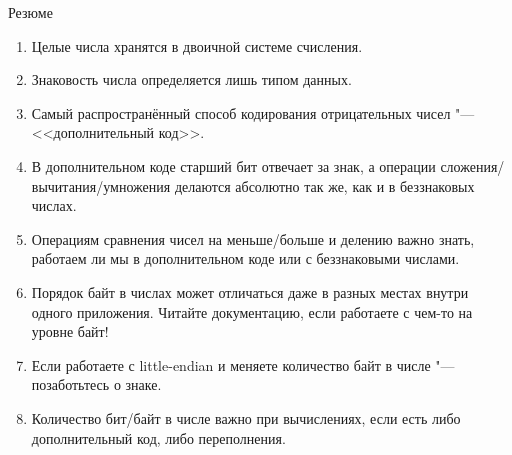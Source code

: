\begin{frame}{Резюме}
	\begin{enumerate}
		\item
			Целые числа хранятся в двоичной системе счисления.
		\item
			Знаковость числа определяется лишь типом данных.
		\item
			Самый распространённый способ кодирования отрицательных чисел "--- <<дополнительный код>>.
		\item
			В дополнительном коде старший бит отвечает за знак, а операции сложения/вычитания/умножения делаются абсолютно так же, как и в беззнаковых числах.
		\item
			Операциям сравнения чисел на меньше/больше и делению важно знать, работаем ли мы в дополнительном коде или с беззнаковыми числами.
		\item
			Порядок байт в числах может отличаться даже в разных местах внутри одного приложения.
			Читайте документацию, если работаете с чем-то на уровне байт!
		\item
			Если работаете с little-endian и меняете количество байт в числе "--- позаботьтесь о знаке.
		\item
			Количество бит/байт в числе важно при вычислениях, если есть либо дополнительный код, либо переполнения.
	\end{enumerate}
\end{frame}
